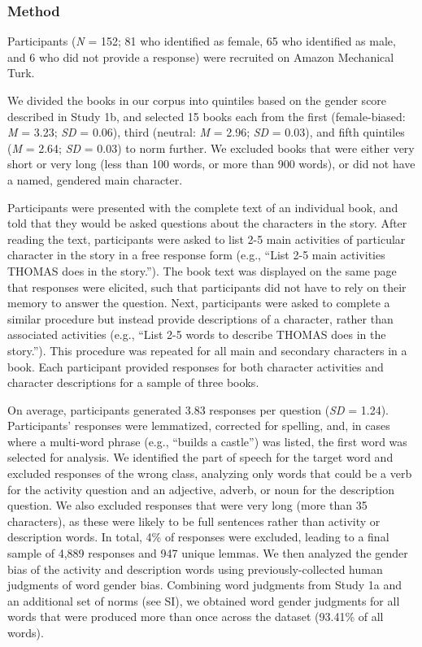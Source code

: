 \documentclass[
  english,
  ,man,floatsintext]{apa6}
\begin{document}
\hypertarget{method-2}{%
\subsubsection{Method}\label{method-2}}

Participants (\emph{N} = 152; 81 who identified as female, 65 who identified as male, and 6 who did not provide a response) were recruited on Amazon Mechanical Turk.

We divided the books in our corpus into quintiles based on the gender score described in Study 1b, and selected 15 books each from the first (female-biased: \emph{M} = 3.23; \emph{SD} = 0.06), third (neutral: \emph{M} = 2.96; \emph{SD} = 0.03), and fifth quintiles (\emph{M} = 2.64; \emph{SD} = 0.03) to norm further. We excluded books that were either very short or very long (less than 100 words, or more than 900 words), or did not have a named, gendered main character.

Participants were presented with the complete text of an individual book, and told that they would be asked questions about the characters in the story. After reading the text, participants were asked to list 2-5 main activities of particular character in the story in a free response form (e.g., \enquote{List 2-5 main activities THOMAS does in the story.}). The book text was displayed on the same page that responses were elicited, such that participants did not have to rely on their memory to answer the question. Next, participants were asked to complete a similar procedure but instead provide descriptions of a character, rather than associated activities (e.g., \enquote{List 2-5 words to describe THOMAS does in the story.}). This procedure was repeated for all main and secondary characters in a book. Each participant provided responses for both character activities and character descriptions for a sample of three books.

On average, participants generated 3.83 responses per question (\emph{SD} = 1.24). Participants' responses were lemmatized, corrected for spelling, and, in cases where a multi-word phrase (e.g., \enquote{builds a castle}) was listed, the first word was selected for analysis. We identified the part of speech for the target word and excluded responses of the wrong class, analyzing only words that could be a verb for the activity question and an adjective, adverb, or noun for the description question. We also excluded responses that were very long (more than 35 characters), as these were likely to be full sentences rather than activity or description words. In total, 4\% of responses were excluded, leading to a final sample of 4,889 responses and 947 unique lemmas. We then analyzed the gender bias of the activity and description words using previously-collected human judgments of word gender bias. Combining word judgments from Study 1a and an additional set of norms (see SI), we obtained word gender judgments for all words that were produced more than once across the dataset (93.41\% of all words).
\end{document}
